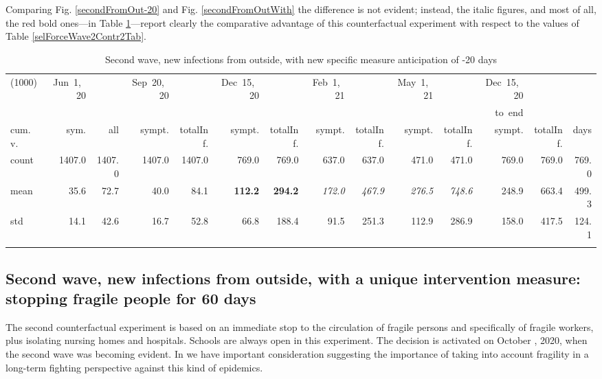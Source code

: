 \documentclass[graybox]{svmult}
\begin{document}
Comparing Fig. \ref{secondFromOut-20} and Fig. \ref{secondFromOutWith} the difference is not evident; instead, the italic figures, and most of all, the red bold ones---in Table \ref{selForceWave2Contr2M-20Tab}---report clearly the comparative advantage of this counterfactual experiment with respect to the values of Table \ref{selForceWave2Contr2Tab}.


\begin{table}[t]
\center
\tiny
\begin{tabular}{lrrrrrrrrrrrrr}
\hline\noalign{\smallskip}
(1000) & Jun~1,~20 & & Sep~20,~20 & & Dec~15,~20 & & Feb~1,~21 & & May~1,~21 & & Dec~15,~20 \\
& & & & & & & & & & & to~end \\
cum.~v. & sym. & all & sympt. & totalInf. & sympt. & totalInf. & sympt. & totalInf. & sympt. & totalInf. & sympt. & totalInf. & days\\
\noalign{\smallskip}\svhline\noalign{\smallskip}
count & 1407.0 & 1407.0 & 1407.0 & 1407.0 & 769.0 & 769.0 & 637.0 & 637.0 & 471.0 & 471.0 & 769.0 & 769.0 & 769.0 \\
mean & 35.6 & 72.7 & 40.0 & 84.1 & \textbf{{\color{red}112.2}} & \textbf{{\color{red} 294.2}} & \emph{172.0} & \emph{467.9} & \emph{276.5} & \emph{748.6} & 248.9 & 663.4 & 499.3 \\
std & 14.1 & 42.6 & 16.7 & 52.8 & 66.8 & 188.4 & 91.5 & 251.3 & 112.9 & 286.9 & 158.0 & 417.5 & 124.1 \\
\hline\noalign{\smallskip}
\end{tabular}
\caption{Second wave, new infections from outside, with new specific measure anticipation of -20 days}
\label{selForceWave2Contr2M-20Tab}
\end{table}


\subsection{Second wave, new infections from outside, with a unique intervention measure: stopping fragile people for 60 days}
\label{frag}

The second counterfactual experiment is based on an immediate stop to the circulation of fragile persons and specifically of fragile workers, plus isolating nursing homes and hospitals. Schools are always open in this experiment. The decision is activated on October , 2020, when the second wave was becoming evident. 
In \cite{phillips2021coronavirus} we have important consideration suggesting the importance of taking into account fragility in a long-term fighting perspective against this kind of epidemics.
\end{document}
